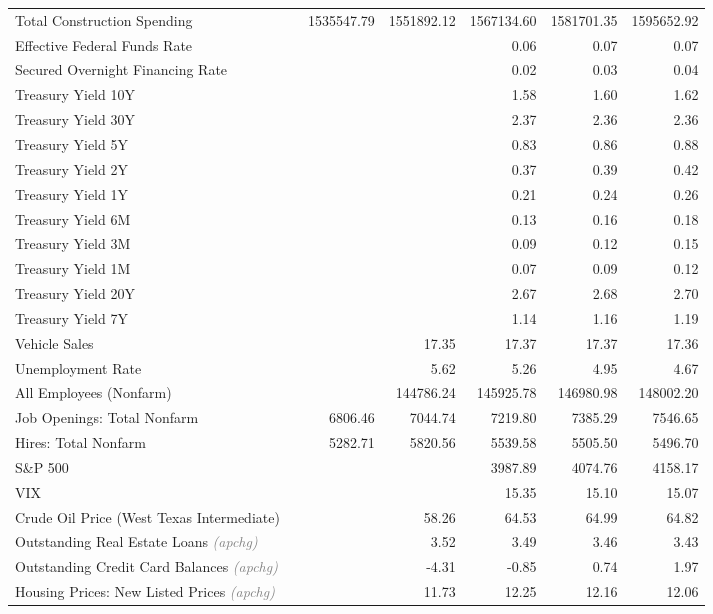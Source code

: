 \documentclass[11pt, letterpaper]{article}\usepackage[]{graphicx}\usepackage[]{color}
\begin{document}
\begin{table}[H]
\begin{tabular}{lrrrrrr}
  Total Construction Spending &  & 1535547.79 & 1551892.12 & 1567134.60 & 1581701.35 & 1595652.92 \\ 
  Effective Federal Funds Rate &  &  &  & 0.06 & 0.07 & 0.07 \\ 
  Secured Overnight Financing Rate &  &  &  & 0.02 & 0.03 & 0.04 \\ 
  Treasury Yield 10Y &  &  &  & 1.58 & 1.60 & 1.62 \\ 
  Treasury Yield 30Y &  &  &  & 2.37 & 2.36 & 2.36 \\ 
  Treasury Yield 5Y &  &  &  & 0.83 & 0.86 & 0.88 \\ 
  Treasury Yield 2Y &  &  &  & 0.37 & 0.39 & 0.42 \\ 
  Treasury Yield 1Y &  &  &  & 0.21 & 0.24 & 0.26 \\ 
  Treasury Yield 6M &  &  &  & 0.13 & 0.16 & 0.18 \\ 
  Treasury Yield 3M &  &  &  & 0.09 & 0.12 & 0.15 \\ 
  Treasury Yield 1M &  &  &  & 0.07 & 0.09 & 0.12 \\ 
  Treasury Yield 20Y &  &  &  & 2.67 & 2.68 & 2.70 \\ 
  Treasury Yield 7Y &  &  &  & 1.14 & 1.16 & 1.19 \\ 
  Vehicle Sales &  &  & 17.35 & 17.37 & 17.37 & 17.36 \\ 
  Unemployment Rate &  &  & 5.62 & 5.26 & 4.95 & 4.67 \\ 
  All Employees (Nonfarm) &  &  & 144786.24 & 145925.78 & 146980.98 & 148002.20 \\ 
  Job Openings: Total Nonfarm &  & 6806.46 & 7044.74 & 7219.80 & 7385.29 & 7546.65 \\ 
  Hires: Total Nonfarm &  & 5282.71 & 5820.56 & 5539.58 & 5505.50 & 5496.70 \\ 
  S\&P 500 &  &  &  & 3987.89 & 4074.76 & 4158.17 \\ 
  VIX &  &  &  & 15.35 & 15.10 & 15.07 \\ 
  Crude Oil Price (West Texas Intermediate) &  &  & 58.26 & 64.53 & 64.99 & 64.82 \\ 
  Outstanding Real Estate Loans \textit{\footnotesize\textcolor{gray}{(apchg)}} &  &  & 3.52 & 3.49 & 3.46 & 3.43 \\ 
  Outstanding Credit Card Balances \textit{\footnotesize\textcolor{gray}{(apchg)}} &  &  & -4.31 & -0.85 & 0.74 & 1.97 \\ 
  Housing Prices: New Listed Prices \textit{\footnotesize\textcolor{gray}{(apchg)}} &  &  & 11.73 & 12.25 & 12.16 & 12.06 \\ 

\end{tabular}
\end{table}
\end{document}
